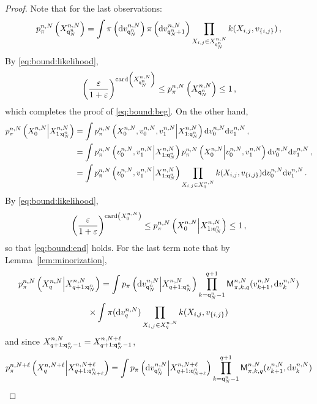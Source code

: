\begin{proof}
Note that for the last observations:
\[
p_{\pi}^{n,N}\left(X_{{\mathsf{q}}^{n}_{N}}^{n,N}\right) = \int \pi\left(\mathrm{d} v_{{\mathsf{q}}^{n}_{N}}^{n,N}\right) \pi\left(\mathrm{d} v_{{\mathsf{q}}^{n}_{N}+1}^{n,N}\right) \prod_{X_{i,j}\in X_{{\mathsf{q}}^{n}_{N}}^{n,N}}k(X_{i,j},v_{\{i,j\}})\,,
\]
By \eqref{eq:bound:likelihood},
\[
 \left(\frac{\varepsilon}{1+\varepsilon}\right)^{\mathrm{card}\left(X_{{\mathsf{q}}^{n}_{N}}^{n,N}\right)}\le p_{\pi}^{n,N}\left(X_{{\mathsf{q}}^{n}_{N}}^{n,N}\right)  \le 1\,,
\]
which completes the proof of \eqref{eq:bound:beg}. On the other hand,
\begin{align*}
p_{\pi}^{n,N}\left(X_{0}^{n,N}\middle|X_{1:{\mathsf{q}}^{n}_{N}}^{n,N}\right) &= \int p_{\pi}^{n,N}\left(X_{0}^{n,N},v_{0}^{n,N},v_{1}^{n,N}\middle|X_{1:{\mathsf{q}}^{n}_{N}}^{n,N}\right)\mathrm{d} v_{0}^{n,N}\mathrm{d} v_{1}^{n,N}\,,\\
&=\int p_{\pi}^{n,N}\left(v_{0}^{n,N},v_{1}^{n,N}\middle|X_{1:{\mathsf{q}}^{n}_{N}}^{n,N}\right) p_{\pi}^{n,N}\left(X_{0}^{n,N}\middle|v_{0}^{n,N},v_{1}^{n,N}\right)\mathrm{d} v_{0}^{n,N}\mathrm{d} v_{1}^{n,N}\,,\\
&=\int p_{\pi}^{n,N}\left(v_{0}^{n,N},v_{1}^{n,N}\middle|X_{1:{\mathsf{q}}^{n}_{N}}^{n,N}\right) \prod_{X_{i,j}\in X_{0}^{n,N}}k(X_{i,j},v_{\{i,j\}})\mathrm{d} v_{0}^{n,N}\mathrm{d} v_{1}^{n,N}\,.
\end{align*}
By \eqref{eq:bound:likelihood},
\[
 \left(\frac{\varepsilon}{1+\varepsilon}\right)^{\mathrm{card}\left(X_{0}^{n,N}\right)}\le p_{\pi}^{n,N}\left(X_{0}^{n,N}\middle|X_{1:{\mathsf{q}}^{n}_{N}}^{n,N}\right) \le 1\,,
\]
so that \eqref{eq:bound:end} holds. For the last term note that by Lemma~\ref{lem:minorization},  
\begin{multline}
\label{eq:decomp:prod:kernel}
p_{\pi}^{n,N}\left(X^{n,N}_{q}\middle|X^{n,N}_{q+1:{\mathsf{q}}^{n}_{N}}\right) = \int p_{\pi}\left(\mathrm{d} v_{{\mathsf{q}}^{n}_{N}}^{n,N}\middle | X^{n,N}_{q+1:{\mathsf{q}}^{n}_{N}}\right) \prod_{k ={\mathsf{q}}^{n}_{N}-1}^{q+1}\mathsf{M}^{n,N}_{\pi,k,q}(v_{k+1}^{n,N},\mathrm{d} v_k^{n,N})\\
\times\int \pi(\mathrm{d} v_q^{n,N})\prod_{X_{i,j}\in X_{q}^{n,N}}k(X_{i,j},v_{\{i,j\}})
\end{multline}
and since $X^{n,N}_{q+1:{\mathsf{q}}^{n}_{N}-1}=X^{n,N+\ell}_{q+1:{\mathsf{q}}^{n}_{N}-1}$,
\begin{multline}
\label{eq:decomp:prod:kernel:plus}
p_{\pi}^{n,N+\ell}\left(X^{n,N+\ell}_{q}\middle|X^{n,N+\ell}_{q+1:\ordermax{n}{N+\ell}}\right) = \int p_{\pi}\left(\rmd v_{\ordermax{n}{N}}^{n,N}\middle | X^{n,N+\ell}_{q+1:\ordermax{n}{N+\ell}}\right) \prod_{k =\ordermax{n}{N}-1}^{q+1}\kernel^{n,N}_{\pi,k,q}(v_{k+1}^{n,N},\rmd v_k^{n,N})\\

\end{multline}
\end{proof}
